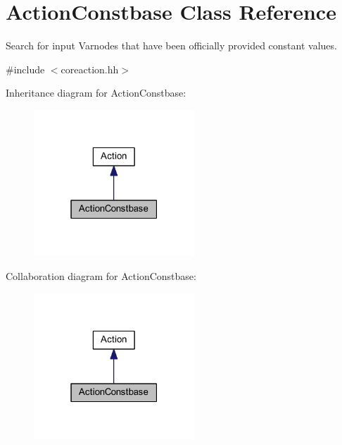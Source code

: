 \hypertarget{class_action_constbase}{}\section{Action\+Constbase Class Reference}
\label{class_action_constbase}


Search for input Varnodes that have been officially provided constant values.  




{\ttfamily \#include $<$coreaction.\+hh$>$}



Inheritance diagram for Action\+Constbase\+:
\nopagebreak
\begin{figure}[H]
\begin{center}
\leavevmode
\includegraphics[width=171pt]{class_action_constbase__inherit__graph}
\end{center}
\end{figure}


Collaboration diagram for Action\+Constbase\+:
\nopagebreak
\begin{figure}[H]
\begin{center}
\leavevmode
\includegraphics[width=171pt]{class_action_constbase__coll__graph}
\end{center}
\end{figure}
